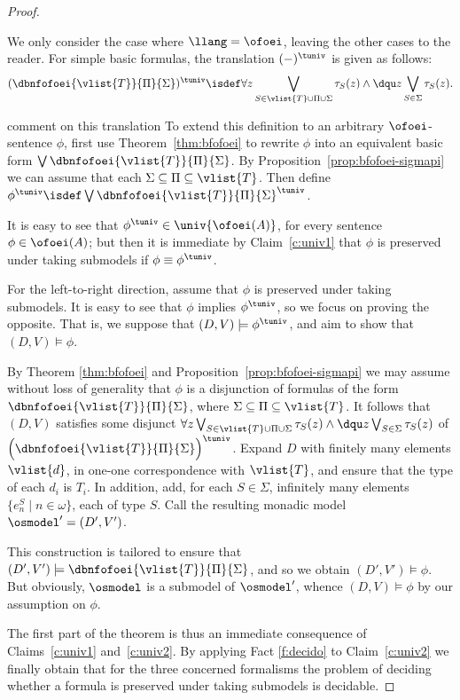 \begin{proof}
\begin{pfclaim} %
We only consider the case where $\llang = \ofoei$, leaving the other cases to 
the reader.
For simple basic formulas, the translation $(-)^\tuniv$ is given as follows:
\[
(\dbnfofoei{\vlist{T}}{\Pi}{\Sigma})^{\tuniv} \isdef 
   \forall z \bigvee_{S \in \vlist{T}\cup \Pi\cup\Sigma} \tau_{S}(z) 
   \land \dqu z \bigvee_{S \in \Sigma} \tau_{S}(z).
\]
\btbs
\item comment on this translation
\etbs
To extend this definition to an arbitrary $\ofoei$-sentence $\phi$, first use Theorem~\ref{thm:bfofoei} to rewrite $\phi$ into an equivalent
basic form $\bigvee \dbnfofoei{\vlist{T}}{\Pi}{\Sigma}$. By Proposition~\ref{prop:bfofoei-sigmapi} we can assume that each
$\Sigma \subseteq \Pi \subseteq \vlist{T}$. Then define 
$\phi^{\tuniv}\isdef \bigvee \dbnfofoei{\vlist{T}}{\Pi}{\Sigma}^{\tuniv}$.

It is easy to see that $\phi^{\tuniv} \in \univ{\ofoei(A)}$, for every sentence
$\phi \in \ofoei(A)$; but then it is immediate by Claim~\ref{c:univ1} that 
$\phi$ is preserved under taking submodels if $\phi \equiv \phi^{\tuniv}$.

For the left-to-right direction, assume that $\phi$ is preserved 
under taking submodels.
It is easy to see that $\phi$ implies $\phi^{\tuniv}$, so we focus on proving
the opposite.
That is, we suppose that $(D,V) \models \phi^{\tuniv}$, and aim to show that 
$(D,V) \models \phi$.
 
By Theorem \ref{thm:bfofoei} and Proposition~\ref{prop:bfofoei-sigmapi} we may assume without loss of 
generality that $\phi$ is a disjunction of formulas of the form 
$\dbnfofoei{\vlist{T}}{\Pi}{\Sigma}$, where $\Sigma \subseteq \Pi \subseteq 
\vlist{T}$.
It follows that $(D,V)$ satisfies some  disjunct 
$   \forall z \bigvee_{S \in \vlist{T}\cup \Pi\cup\Sigma} \tau_{S}(z) 
   \land \dqu z \bigvee_{S \in \Sigma} \tau_{S}(z)$
of $\Big(\dbnfofoei{\vlist{T}}{\Pi}{\Sigma}\Big)^{\tuniv}$.
Expand $D$ with finitely many elements $\vlist{d}$, in one-one correspondence 
with $\vlist{T}$, and ensure that the type of each $d_{i}$ is $T_{i}$.
In addition, add, for each $S \in \Sigma$, infinitely many elements 
$\{ e^{S}_{n} \mid n \in \omega\}$, each of type $S$.
Call the resulting monadic model $\osmodel' = (D',V')$.

This construction is tailored to ensure that 
$(D',V') \models \dbnfofoei{\vlist{T}}{\Pi}{\Sigma}$, and so we obtain $(D',V') 
\models \phi$.
But obviously, $\osmodel$ is a submodel of $\osmodel'$, whence $(D,V) \models 
\phi$ by our assumption on $\phi$.
\end{pfclaim}

The  first part of  the theorem is thus an immediate consequence of 
Claims~\ref{c:univ1} and~\ref{c:univ2}. By applying Fact \ref{f:decido} to Claim~\ref{c:univ2} we finally obtain that for the three concerned formalisms the problem of deciding whether a formula is preserved under taking submodels is decidable.
\end{proof}

